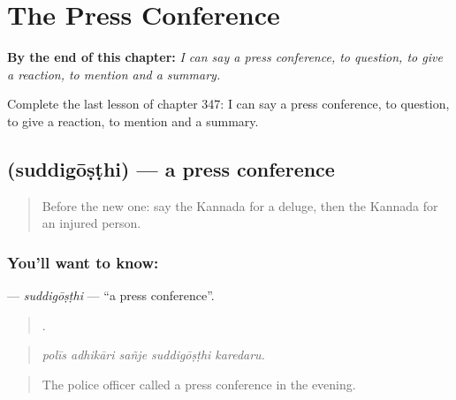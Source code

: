 
\chapter{The Press Conference}
\label{ch:ka-the-press-conference}

\begin{chapteropening}
\textbf{By the end of this chapter:} \emph{I can say a press conference, to question, to give a reaction, to mention and a summary.}

Complete the last lesson of chapter 347: I can say a press conference, to question, to give a reaction, to mention and a summary.
\end{chapteropening}

\section[\texorpdfstring{\kn{ಸುದ್ದಿಗೋಷ್ಠಿ} (suddigōṣṭhi)}{ಸುದ್ದಿಗೋಷ್ಠಿ (suddigōṣṭhi)}]{ (suddigōṣṭhi) — a press conference}

\label{lesson:KA-C347-suddigosthi}



\begin{quote}
Before the new one: say the Kannada for a deluge, then the Kannada for an injured person.
\end{quote}

\subsection*{You'll want to know: }
\textbf{} — \emph{suddigōṣṭhi} — \textquotedblleft{}a press conference\textquotedblright{}.

\begin{quote}
    .
\end{quote}

\begin{quote}
\emph{polīs adhikāri sañje suddigōṣṭhi karedaru.}
\end{quote}

\begin{quote}
The police officer called a press conference in the evening.
\end{quote}

